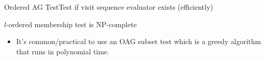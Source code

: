 \begin{frame}{Ordered AG Test}{Test if visit sequence evaluator exists (efficiently)}

$l$-ordered membership test is \alert{NP-complete} \cite{ENGELFRIET1982283}

\begin{itemize}
    \item It's common/practical to use an \alert{OAG subset test} which is a greedy algorithm that runs in \alert{polynomial time}.
\end{itemize}

\end{frame}




